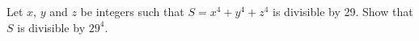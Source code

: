 Let $ x$, $ y$ and $ z$ be integers such that $ S = x^{4}+y^{4}+z^{4}$ is divisible by 29. Show that $ S$ is divisible by $ 29^{4}$.